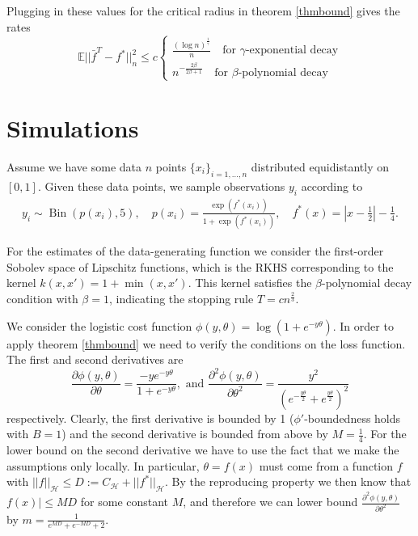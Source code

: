 Plugging in these values for the critical radius in theorem \ref{thmbound} gives the rates
\begin{equation*}
\mathbb{E}||\bar{f}^T-f^*||_n^2 \le c\begin{cases}
\frac{(\log n)^{\frac{1}{\gamma}}}{n} \quad\text{for $\gamma$-exponential decay}\\
n^{-\frac{2\beta}{2\beta + 1}} \quad\text{for $\beta$-polynomial decay}
\end{cases}
\end{equation*}
\section{Simulations}
Assume we have some data $n$ points $\{x_i\}_{i=1,\dots,n}$ distributed equidistantly on $[0,1]$. Given these data points, we sample observations $y_i$ according to
\begin{align*}
y_i \sim \operatorname{Bin}(p(x_i), 5), \quad
p(x_i)=\frac{\exp(f^*(x_i))}{1+\exp(f^*(x_i))}, \quad f^*(x) = |x-\frac{1}{2}| - \frac{1}{4}.
\end{align*}

For the estimates of the data-generating function we consider the first-order Sobolev space of Lipschitz functions, which is the RKHS corresponding to the kernel $k(x,x') = 1 + \min(x,x')$. This kernel satisfies the $\beta$-polynomial decay condition with $\beta=1$, indicating the stopping rule $T=cn^{\frac{2}{3}}$.

We consider the logistic cost function $\phi(y,\theta)=\log(1+e^{-y\theta})$. In order to apply theorem \ref{thmbound} we need to verify the conditions on the loss function. The first and second derivatives are
\begin{equation*}
\frac{\partial\phi(y,\theta)}{\partial\theta} = \frac{-ye^{-y\theta}}{1+e^{-y\theta}}, \text{ and } \frac{\partial^2\phi(y,\theta)}{\partial\theta^2} = \frac{y^2}{(e^{-\frac{y\theta}{2}}+e^{\frac{y\theta}{2}})^2}
\end{equation*}
respectively. Clearly, the first derivative is bounded by 1 ($\phi'$-boundedness holds with $B=1$) and the second derivative is bounded from above by $M=\frac{1}{4}$. For the lower bound on the second derivative we have to use the fact that we make the assumptions only locally. In particular, $\theta=f(x)$ must come from a function $f$ with $||f||_{\mathcal{H}}\le D := C_{\mathcal{H}} + ||f^*||_{\mathcal{H}}$. By the reproducing property we then know that $f(x)|\le MD$ for some constant $M$, and therefore we can lower bound $\frac{\partial^2\phi(y,\theta)}{\partial\theta^2}$ by $m=\frac{1}{e^{MD}+e^{-MD}+2}$.

